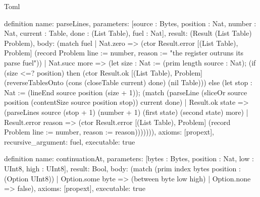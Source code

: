 \begin{lexlean}{Toml}
\begin{semanticmodule}
definition{
  name: parseLines,
  parameters: [source : Bytes, position : Nat, number : Nat, current : Table, done : (List Table), fuel : Nat],
  result: (Result (List Table) Problem),
  body: (match fuel
    | Nat.zero => (ctor Result.error [(List Table), Problem] (record Problem {line := number, reason := "the register outruns its parse fuel"}))
    | Nat.succ more => (let size : Nat := (prim length source : Nat); (if (size <=? position) then (ctor Result.ok [(List Table), Problem] (reverseTablesOnto (cons (closeTable current) done) (nil Table))) else (let stop : Nat := (lineEnd source position (size + 1)); (match (parseLine (sliceOr source position (contentSize source position stop)) current done)
      | Result.ok state => (parseLines source (stop + 1) (number + 1) (first state) (second state) more)
      | Result.error reason => (ctor Result.error [(List Table), Problem] (record Problem {line := number, reason := reason}))))))),
  axioms: [propext],
  recursive_argument: fuel,
  executable: true
}

definition{
  name: continuationAt,
  parameters: [bytes : Bytes, position : Nat, low : UInt8, high : UInt8],
  result: Bool,
  body: (match (prim index bytes position : (Option UInt8))
    | Option.some byte => (between byte low high)
    | Option.none => false),
  axioms: [propext],
  executable: true
}


\end{semanticmodule}
\end{lexlean}

